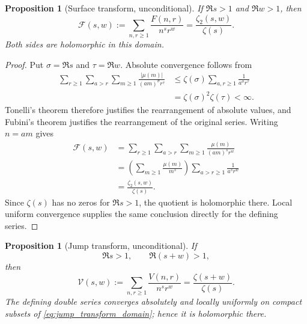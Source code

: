 \documentclass[11pt]{amsart}
\numberwithin{equation}{section}
\theoremstyle{plain}
\newtheorem{proposition}[theorem]{Proposition}
\theoremstyle{definition}
\theoremstyle{remark}
\newcommand{\mob}{\mu}
\newcommand{\Fsurf}{F}
\newcommand{\Vjump}{V}
\begin{document}
\begin{proposition}[Surface transform, unconditional]
\label{prop:surface_transform}
If $\Re s>1$ and $\Re w>1$, then
\begin{equation}
\mathscr F(s,w)
:=\sum_{n,r\ge1}\frac{\Fsurf(n,r)}{n^s r^w}
=\frac{\zeta_2(s,w)}{\zeta(s)}.
\label{eq:surface_transform}
\end{equation}
Both sides are holomorphic in this domain.
\end{proposition}

\begin{proof}
Put $\sigma=\Re s$ and $\tau=\Re w$.  Absolute convergence follows from
\begin{align}
\sum_{r\ge1}\sum_{a>r}\sum_{m\ge1}
\frac{|\mob(m)|}{(am)^\sigma r^\tau}
&\le \zeta(\sigma)\sum_{a,r\ge1}\frac1{a^\sigma r^\tau}
\label{eq:surface_absolute_bound}\\
&=\zeta(\sigma)^2\zeta(\tau)<\infty.
\label{eq:surface_absolute_bound_final}
\end{align}
Tonelli's theorem therefore justifies the rearrangement of absolute values, and Fubini's theorem justifies the rearrangement of the original series.  Writing $n=am$ gives
\begin{align}
\mathscr F(s,w)
&=\sum_{r\ge1}\sum_{a>r}\sum_{m\ge1}
\frac{\mob(m)}{(am)^s r^w}
\label{eq:surface_transform_expand}\\
&=\left(\sum_{m\ge1}\frac{\mob(m)}{m^s}\right)
\sum_{a>r\ge1}\frac1{a^s r^w}
\label{eq:surface_transform_factor}\\
&=\frac{\zeta_2(s,w)}{\zeta(s)}.
\label{eq:surface_transform_finish}
\end{align}
Since $\zeta(s)$ has no zeros for $\Re s>1$, the quotient is holomorphic there.  Local uniform convergence supplies the same conclusion directly for the defining series.
\end{proof}

\begin{proposition}[Jump transform, unconditional]
\label{prop:jump_transform}
If
\begin{equation}
\Re s>1,
\qquad
\Re(s+w)>1,
\label{eq:jump_transform_domain}
\end{equation}
then
\begin{equation}
\mathscr V(s,w)
:=\sum_{n,r\ge1}\frac{\Vjump(n,r)}{n^s r^w}
=\frac{\zeta(s+w)}{\zeta(s)}.
\label{eq:jump_transform}
\end{equation}
The defining double series converges absolutely and locally uniformly on compact subsets of \eqref{eq:jump_transform_domain}; hence it is holomorphic there.
\end{proposition}
\end{document}
